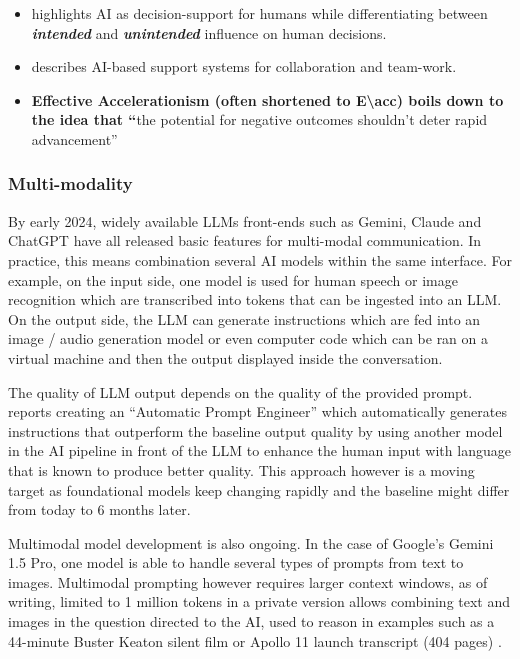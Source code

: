 \documentclass[
  letterpaper,
  DIV=11,
  numbers=noendperiod]{scrartcl}
\providecommand{\tightlist}{%
  \setlength{\itemsep}{0pt}\setlength{\parskip}{0pt}}\usepackage{longtable,booktabs,array}
\begin{document}
\begin{itemize}
\tightlist
\item
  \citet{cromptonDecisionpointdilemmaAnotherProblem2021} highlights AI
  as decision-support for humans while differentiating between
  \textbf{\emph{intended}} and \textbf{\emph{unintended}} influence on
  human decisions.
\item
  \citet{chengInvestigationTrustAIenabled2022} describes AI-based
  support systems for collaboration and team-work.
\item
  \textbf{Effective Accelerationism (often shortened to
  E\textbackslash acc) boils down to the idea that ``}the potential for
  negative outcomes shouldn't deter rapid advancement''
\end{itemize}

\subsubsection{Multi-modality}\label{multi-modality}

By early 2024, widely available LLMs front-ends such as Gemini, Claude
and ChatGPT have all released basic features for multi-modal
communication. In practice, this means combination several AI models
within the same interface. For example, on the input side, one model is
used for human speech or image recognition which are transcribed into
tokens that can be ingested into an LLM. On the output side, the LLM can
generate instructions which are fed into an image / audio generation
model or even computer code which can be ran on a virtual machine and
then the output displayed inside the conversation.

The quality of LLM output depends on the quality of the provided prompt.
\citet{zhouLargeLanguageModels2022} reports creating an ``Automatic
Prompt Engineer'' which automatically generates instructions that
outperform the baseline output quality by using another model in the AI
pipeline in front of the LLM to enhance the human input with language
that is known to produce better quality. This approach however is a
moving target as foundational models keep changing rapidly and the
baseline might differ from today to 6 months later.

Multimodal model development is also ongoing. In the case of Google's
Gemini 1.5 Pro, one model is able to handle several types of prompts
from text to images. Multimodal prompting however requires larger
context windows, as of writing, limited to 1 million tokens in a private
version allows combining text and images in the question directed to the
AI, used to reason in examples such as a 44-minute Buster Keaton silent
film or Apollo 11 launch transcript (404 pages)
\citet{googleMultimodalPrompting44minute2024}.
\end{document}
